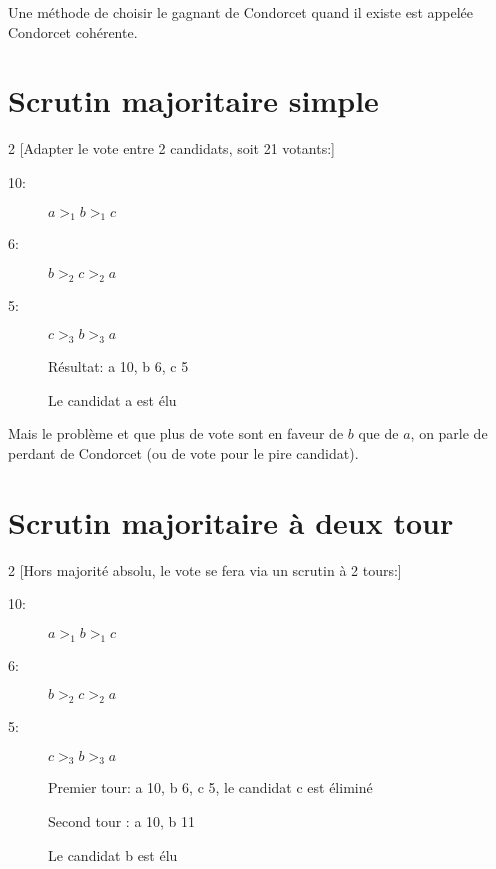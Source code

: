 Une méthode de choisir le gagnant de Condorcet quand il existe est appelée Condorcet cohérente.

\section{Scrutin majoritaire simple}

\begin{multicols}{2}
[Adapter le vote entre 2 candidats, soit 21 votants:]
\begin{description}
\item[10:] $a >_1 b >_1 c$
\item[6:] $b >_2 c >_2 a$
\item[5:] $c >_3 b >_3 a$
\end{description}
\begin{description}
\item[] Résultat: a 10, b 6, c 5
\item[] Le candidat a est élu
\item[] 
\end{description}
\end{multicols}

Mais le problème et que plus de vote sont en faveur de $b$ que de $a$, on parle de perdant de Condorcet (ou de vote pour le pire candidat).

\section{Scrutin majoritaire à deux tour}
\begin{multicols}{2}
[Hors majorité absolu, le vote se fera via un scrutin à 2 tours:]
\begin{description}
\item[10:] $a >_1 b >_1 c$
\item[6:] $b >_2 c >_2 a$
\item[5:] $c >_3 b >_3 a$
\end{description}
\begin{description}
\item[] Premier tour: a 10, b 6, c 5, le candidat c est éliminé
\item[] Second tour : a 10, b 11
\item[] Le candidat b est élu
\end{description}
\end{multicols}

